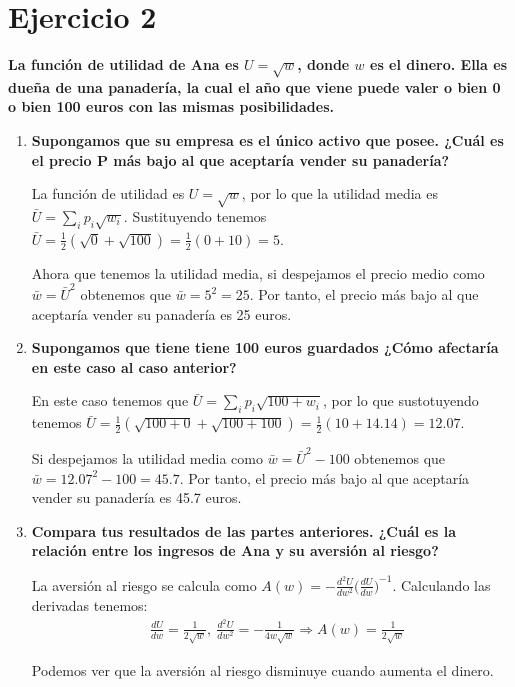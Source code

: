 \documentclass[12pt, letterpaper]{article}
\begin{document}
\section{Ejercicio 2}
\textbf{La función de utilidad de Ana es $U = \sqrt{w}$, donde $w$ es el
dinero. Ella es dueña de una panadería, la cual el año que viene puede valer
o bien 0 o bien 100 euros con las mismas posibilidades.}
\begin{enumerate}
    \item \textbf{Supongamos que su empresa es el único activo que posee. ¿Cuál es el precio P más bajo al que aceptaría vender su panadería?}

    La función de utilidad es $U = \sqrt{w}$, por lo que la utilidad media es $\bar{U} = \sum_i p_i\sqrt{w_i}$. Sustituyendo tenemos $\bar{U} = \frac{1}{2}(\sqrt{0} + \sqrt{100}) = \frac{1}{2}(0 + 10) = 5$. 

    Ahora que tenemos la utilidad media, si despejamos el precio medio como $\bar{w} = \bar{U}^2$ obtenemos que $\bar{w} = 5^2 = 25$. Por tanto, el precio más bajo al que aceptaría vender su panadería es 25 euros.

    \item \textbf{Supongamos que tiene tiene 100 euros guardados ¿Cómo afectaría en este caso al caso anterior?}
    
    En este caso tenemos que $\bar{U} = \sum_i p_i\sqrt{100 + w_i}$, por lo que sustotuyendo tenemos $\bar{U} = \frac{1}{2}(\sqrt{100 + 0} + \sqrt{100 + 100}) = \frac{1}{2}(10 + 14.14) = 12.07$. 

    Si despejamos la utilidad media como $\bar{w} = \bar{U}^2 - 100$ obtenemos que $\bar{w} = 12.07^2 - 100 = 45.7$. Por tanto, el precio más bajo al que aceptaría vender su panadería es 45.7 euros.

    \item\textbf{Compara tus resultados de las partes anteriores. ¿Cuál es la relación entre los ingresos de Ana y su aversión al riesgo?}
    
    La aversión al riesgo se calcula como $A(w) = -\frac{d^2U}{dw^2} {\big(\frac{dU}{dw}\big)}^{-1}$. Calculando las derivadas tenemos:
    \begin{align*}
        &   \frac{dU}{dw} = \frac{1}{2\sqrt{w}},\
        \frac{d^2U}{dw^2} = -\frac{1}{4w\sqrt{w}} \Rightarrow
        A(w) = \frac{1}{2\sqrt{w}}
    \end{align*}

    Podemos ver que la aversión al riesgo disminuye cuando aumenta el dinero.

\end{enumerate}
\end{document}
